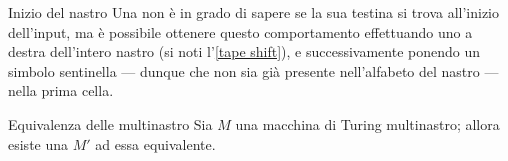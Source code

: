 \documentclass[a4paper, 12pt]{report}
\begin{document}
    \begin{framedobs}[label={tape start}]{Inizio del nastro}
        Una \TM non è in grado di sapere se la sua testina si trova all'inizio dell'input, ma è possibile ottenere questo comportamento effettuando uno  a destra dell'intero nastro (si noti l'\cref{tape shift}), e successivamente ponendo un simbolo sentinella --- dunque che non sia già presente nell'alfabeto del nastro --- nella prima cella.
    \end{framedobs}

    \begin{framedprop}[label={multitape equiv}]{Equivalenza delle \TM multinastro}
        Sia $M$ una macchina di Turing multinastro; allora esiste una \TM $M'$ ad essa equivalente.
    \end{framedprop}
\end{document}
